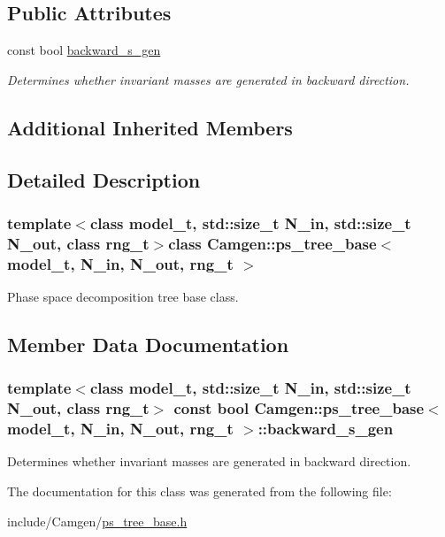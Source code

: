 \subsection*{Public Attributes}
\begin{DoxyCompactItemize}
\item 
const bool \hyperlink{a00458_af8cfb50e9311bed446ab90546c5956e5}{backward\+\_\+s\+\_\+gen}
\begin{DoxyCompactList}\small\item\em Determines whether invariant masses are generated in backward direction. \end{DoxyCompactList}\end{DoxyCompactItemize}
\subsection*{Additional Inherited Members}


\subsection{Detailed Description}
\subsubsection*{template$<$class model\+\_\+t, std\+::size\+\_\+t N\+\_\+in, std\+::size\+\_\+t N\+\_\+out, class rng\+\_\+t$>$class Camgen\+::ps\+\_\+tree\+\_\+base$<$ model\+\_\+t, N\+\_\+in, N\+\_\+out, rng\+\_\+t $>$}

Phase space decomposition tree base class. 

\subsection{Member Data Documentation}
\hypertarget{a00458_af8cfb50e9311bed446ab90546c5956e5}{}
\subsubsection[{backward\+\_\+s\+\_\+gen}]{\setlength{\rightskip}{0pt plus 5cm}template$<$class model\+\_\+t, std\+::size\+\_\+t N\+\_\+in, std\+::size\+\_\+t N\+\_\+out, class rng\+\_\+t$>$ const bool {\bf Camgen\+::ps\+\_\+tree\+\_\+base}$<$ model\+\_\+t, N\+\_\+in, N\+\_\+out, rng\+\_\+t $>$\+::backward\+\_\+s\+\_\+gen}\label{a00458_af8cfb50e9311bed446ab90546c5956e5}


Determines whether invariant masses are generated in backward direction. 



The documentation for this class was generated from the following file\+:\begin{DoxyCompactItemize}
\item 
include/\+Camgen/\hyperlink{a00745}{ps\+\_\+tree\+\_\+base.\+h}\end{DoxyCompactItemize}
